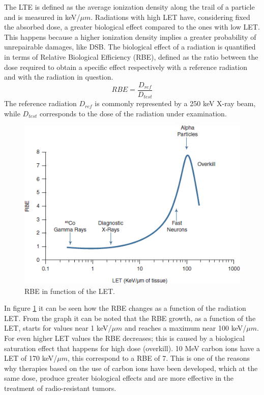 \noindent The LTE is defined as the average ionization density along the trail of a particle and is measured in keV/$\mu m$.
Radiations with high LET have, considering fixed the absorbed dose, a greater biological effect compared to the ones with low LET.
This happens because a higher ionization density implies a greater probability of unrepairable damages, like DSB.
The biological effect of a radiation is quantified in terms of Relative Biological Efficiency (RBE), defined as the ratio between the dose required to obtain a specific effect respectively with a reference radiation and with the radiation in question.
\begin{equation}\label{eq:rbe}
	RBE=\frac{D_{ref}}{D_{test}}
\end{equation}
\noindent The reference radiation $D_{ref}$ is commonly represented by a 250 keV X-ray beam, while $D_{test}$ corresponds to the dose of the radiation under examination.
\begin{figure}[H]
	\centering
	\includegraphics[width=0.7\linewidth]{IMG/ch1/RBE}
	\caption{RBE in function of the LET.}
	\label{fig:rbe}
\end{figure}
\noindent In figure \ref{fig:rbe} it can be seen how the RBE changes as a function of the radiation LET. From the graph it can be noted that the RBE growth, as a function of the LET, starts for values near 1 keV/$\mu m$ and reaches a maximum near 100 keV/$\mu m$. For even higher LET values the RBE decreases; this is caused by a biological saturation effect that happens for high dose (overkill). 
10 MeV carbon ions have a LET of 170 keV/$\mu m$, this correspond to a RBE of 7. This is one of the reasons why therapies based on the use of carbon ions have been developed, which at the same dose, produce greater biological effects and are more effective in the treatment of radio-resistant tumors.


